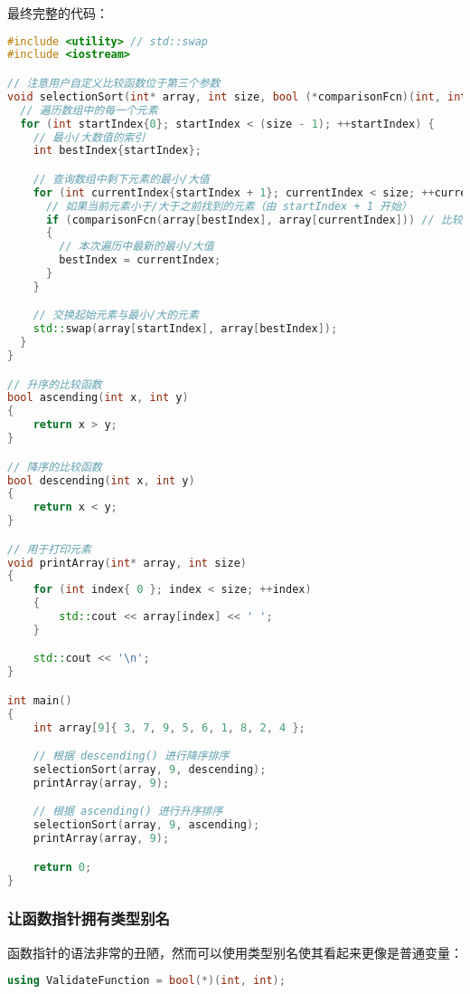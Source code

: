 \documentclass[../../LearnCpp.tex]{subfiles}
\begin{document}
最终完整的代码：

\begin{lstlisting}[language=C++]
#include <utility> // std::swap
#include <iostream>

// 注意用户自定义比较函数位于第三个参数
void selectionSort(int* array, int size, bool (*comparisonFcn)(int, int)) {
  // 遍历数组中的每一个元素
  for (int startIndex{0}; startIndex < (size - 1); ++startIndex) {
    // 最小/大数值的索引
    int bestIndex{startIndex};

    // 查询数组中剩下元素的最小/大值
    for (int currentIndex{startIndex + 1}; currentIndex < size; ++currentIndex) {
      // 如果当前元素小于/大于之前找到的元素（由 startIndex + 1 开始）
      if (comparisonFcn(array[bestIndex], array[currentIndex])) // 比较在这里完成
      {
        // 本次遍历中最新的最小/大值
        bestIndex = currentIndex;
      }
    }

    // 交换起始元素与最小/大的元素
    std::swap(array[startIndex], array[bestIndex]);
  }
}

// 升序的比较函数
bool ascending(int x, int y)
{
    return x > y;
}

// 降序的比较函数
bool descending(int x, int y)
{
    return x < y;
}

// 用于打印元素
void printArray(int* array, int size)
{
    for (int index{ 0 }; index < size; ++index)
    {
        std::cout << array[index] << ' ';
    }

    std::cout << '\n';
}

int main()
{
    int array[9]{ 3, 7, 9, 5, 6, 1, 8, 2, 4 };

    // 根据 descending() 进行降序排序
    selectionSort(array, 9, descending);
    printArray(array, 9);

    // 根据 ascending() 进行升序排序
    selectionSort(array, 9, ascending);
    printArray(array, 9);

    return 0;
}
\end{lstlisting}

\subsubsection*{让函数指针拥有类型别名}

函数指针的语法非常的丑陋，然而可以使用类型别名使其看起来更像是普通变量：

\begin{lstlisting}[language=C++]
using ValidateFunction = bool(*)(int, int);
\end{lstlisting}
\end{document}
